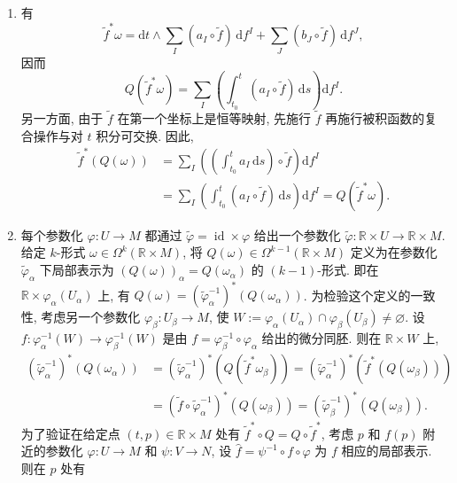 \begin{description}[font=\normalfont,leftmargin=2em,labelwidth=1.5em]
\begin{enumerate}[label=(\alph*),ref=\alph*,leftmargin=*]
\item 有
\[
  \widetilde f^*\omega=\mathrm{d}t\wedge\sum_I(a_I\circ\widetilde f)\,\mathrm{d}f^I
   +\sum_J(b_J\circ\widetilde f)\,\mathrm{d}f^J,
\]
因而
\[
  Q(\widetilde f^*\omega)=\sum_I\left(\int_{t_0}^t(a_I\circ\widetilde f)\,\mathrm{d}s\right)\mathrm{d}f^I.
\]
另一方面, 由于 $\widetilde f$ 在第一个坐标上是恒等映射, 先施行 $\widetilde f$ 再施行被积函数的复合操作与对 $t$ 积分可交换. 因此,
\begin{align*}
  \widetilde f^*(Q(\omega))
  &=\sum_I\left(\left(\int_{t_0}^t a_I\,\mathrm{d}s\right)\circ\widetilde f\right)\mathrm{d}f^I\\
  &=\sum_I\left(\int_{t_0}^t(a_I\circ\widetilde f)\,\mathrm{d}s\right)\mathrm{d}f^I=Q(\widetilde f^*\omega).
\end{align*}
\item 每个参数化 $\varphi:U\to M$ 都通过 $\widetilde\varphi=\operatorname{id}\times\varphi$ 给出一个参数化 $\widetilde\varphi:\mathbb{R}\times U\to\mathbb{R}\times M$. 给定 $k$-形式 $\omega\in\Omega^k(\mathbb{R}\times M)$, 将 $Q(\omega)\in\Omega^{k-1}(\mathbb{R}\times M)$ 定义为在参数化 $\widetilde\varphi_\alpha$ 下局部表示为 $(Q(\omega))_\alpha=Q(\omega_\alpha)$ 的 $(k-1)$-形式. 即在 $\mathbb{R}\times\varphi_\alpha(U_\alpha)$ 上, 有 $Q(\omega)=(\widetilde\varphi_\alpha^{-1})^*(Q(\omega_\alpha))$. 为检验这个定义的一致性, 考虑另一个参数化 $\varphi_\beta:U_\beta\to M$, 使 $W:=\varphi_\alpha(U_\alpha)\cap\varphi_\beta(U_\beta)\ne\varnothing$. 设 $f:\varphi_\alpha^{-1}(W)\to\varphi_\beta^{-1}(W)$ 是由 $f=\varphi_\beta^{-1}\circ\varphi_\alpha$ 给出的微分同胚. 则在 $\mathbb{R}\times W$ 上,
\begin{align*}
  (\widetilde\varphi_\alpha^{-1})^*(Q(\omega_\alpha))
  &=(\widetilde\varphi_\alpha^{-1})^*(Q(\widetilde f^*\omega_\beta))
  =(\widetilde\varphi_\alpha^{-1})^*(\widetilde f^*(Q(\omega_\beta)))\\
  &=(\widetilde f\circ\widetilde\varphi_\alpha^{-1})^*(Q(\omega_\beta))
  =(\widetilde\varphi_\beta^{-1})^*(Q(\omega_\beta)).
\end{align*}
为了验证在给定点 $(t,p)\in\mathbb{R}\times M$ 处有 $\widetilde f^*\circ Q=Q\circ\widetilde f^*$, 考虑 $p$ 和 $f(p)$ 附近的参数化 $\varphi:U\to M$ 和 $\psi:V\to N$, 设 $\widehat f=\psi^{-1}\circ f\circ\varphi$ 为 $f$ 相应的局部表示. 则在 $p$ 处有
\begin{align*}

\end{align*}
\end{enumerate}
\end{description}
